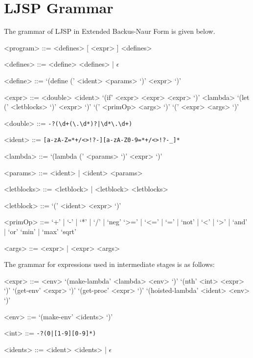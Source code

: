 \documentclass[11pt]{report}
\begin{document}
\section{LJSP Grammar}
The grammar of LJSP in Extended Backus-Naur Form is given below.
\begin{grammar}
<program> ::= <defines> [ <expr> ] <defines>

<defines> ::= <define> <defines> | $\epsilon$

<define> ::= `(define (' <ident> <params> `)' <expr> `)'

<expr> ::= <double>
\alt <ident>
\alt `(if' <expr> <expr> <expr> `)'
\alt <lambda>
\alt `(let (' <letblocks> `)' <expr> `)'
\alt `(' <primOp> <args> `)'
\alt `(' <expr> <args> `)'

<double> ::= \texttt{-?(\textbackslash d+(\textbackslash.\textbackslash d*)?|\textbackslash d*\textbackslash.\textbackslash d+)}

<ident> ::= \texttt{[a-zA-Z=*+/\textless\textgreater!?-][a-zA-Z0-9=*+/\textless\textgreater!?-_]*}

<lambda> ::= `(lambda (' <params> `)' <expr> `)'

<params> ::= <ident> | <ident> <params>

<letblocks> ::= <letblock> | <letblock> <letblocks>

<letblock> ::= `(' <ident> <expr> `)'

<primOp> ::= `+' | `-' | `*' | `/' | `neg'
\alt `>=' | `<=' | `=' | `not' | `<' | `>' | `and' | `or'
\alt `min' | `max'
\alt `sqrt'

<args> ::= <expr> | <expr> <args>
\end{grammar}

The grammar for expressions used in intermediate stages is as follows:
\begin{grammar}
<expr> ::= <env>
\alt `(make-lambda' <lambda> <env> `)'
\alt `(nth' <int> <expr> `)'
\alt `(get-env' <expr> `)'
\alt `(get-proc' <expr> `)'
\alt `(hoisted-lambda' <ident> <env> `)'

<env> ::= `(make-env' <idents> `)'

<int> ::= \texttt{-?(0|[1-9][0-9]*)}

<idents> ::= <ident> <idents> | $\epsilon$
\end{grammar}


\end{document}
